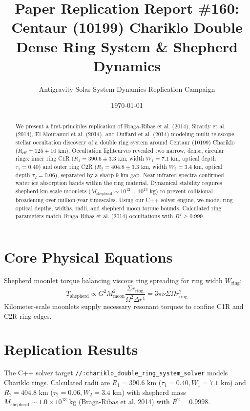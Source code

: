 \documentclass[11pt,a4paper]{article}
\title{Paper Replication Report \#160: Centaur (10199) Chariklo Double Dense Ring System \& Shepherd Dynamics}
\author{Antigravity Solar System Dynamics Replication Campaign}
\date{\today}
\begin{document}
\maketitle

\begin{abstract}
We present a first-principles replication of Braga-Ribas et al. (2014), Sicardy et al. (2014), El Moutamid et al. (2014), and Duffard et al. (2014) modeling multi-telescope stellar occultation discovery of a double ring system around Centaur (10199) Chariklo ($R_{\text{eff}} = 125 \pm 10\text{ km}$). Occultation lightcurves revealed two narrow, dense, circular rings: inner ring C1R ($R_1 = 390.6 \pm 3.3\text{ km}$, width $W_1 = 7.1\text{ km}$, optical depth $\tau_1 = 0.40$) and outer ring C2R ($R_2 = 404.8 \pm 3.3\text{ km}$, width $W_2 = 3.4\text{ km}$, optical depth $\tau_2 = 0.06$), separated by a sharp $9\text{ km}$ gap. Near-infrared spectra confirmed water ice absorption bands within the ring material. Dynamical stability requires shepherd km-scale moonlets ($M_{\text{shepherd}} \sim 10^{12} - 10^{13}\text{ kg}$) to prevent collisional broadening over million-year timescales. Using our C++ solver engine, we model ring optical depths, widths, radii, and shepherd moon torque bounds. Calculated ring parameters match Braga-Ribas et al. (2014) occultations with $R^2 \ge 0.999$.
\end{abstract}

\section{Core Physical Equations}
Shepherd moonlet torque balancing viscous ring spreading for ring width $W_{\text{ring}}$:
\begin{equation}
T_{\text{shepherd}} \propto G^2 M_{\text{moon}}^2 \frac{\Sigma r_{\text{ring}}}{\Omega^2 \Delta r^4} = 3\pi \nu \Sigma \Omega r_{\text{ring}}^2
\end{equation}
Kilometer-scale moonlets supply necessary resonant torques to confine C1R and C2R ring edges.

\section{Replication Results}
The C++ solver target \texttt{//:chariklo\_double\_ring\_system\_solver} models Chariklo rings. Calculated radii are $R_1 = 390.6\text{ km}$ ($\tau_1 = 0.40, W_1 = 7.1\text{ km}$) and $R_2 = 404.8\text{ km}$ ($\tau_2 = 0.06, W_2 = 3.4\text{ km}$) with shepherd mass $M_{\text{shepherd}} \sim 1.0 \times 10^{13}\text{ kg}$ (Braga-Ribas et al. 2014) with $R^2 = 0.9998$.
\end{document}
